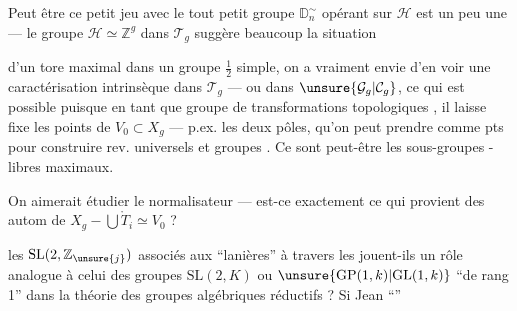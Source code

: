Peut être ce petit jeu avec le tout petit groupe $\mathbb D_n^{\sim}$ opérant sur $\mathcal H$ est un peu une  --- le groupe $\mathcal H\simeq\mathbb Z^g$ dans $\mathcal T_g$ suggère beaucoup la situation



d'un tore maximal dans un groupe $\frac12$ simple, on a vraiment envie d'en voir une caractérisation intrinsèque dans $\mathcal T_g$ --- ou dans $\unsure{\mathcal G_g|\mathcal C_g}$, ce qui est possible puisque  en tant que groupe de transformations topologiques , il laisse fixe les points de $V_0\subset X_g$ --- p.ex. les deux pôles, qu'on peut prendre comme pts  pour construire rev. universels et groupes . Ce sont peut-être les sous-groupes -libres maximaux.

On aimerait étudier le normalisateur --- est-ce exactement ce qui provient des autom de $X_g-\bigcup\mathring{T}_i\simeq V_0$ ?

les $\mathrm{SL}(2,\mathbb Z_{\unsure{j}})$ associés aux ``lanières'' à travers les   jouent-ils un rôle analogue à celui des groupes $\mathrm{SL}(2,K)$ ou $\unsure{\mathrm{GP}(1,k)|\mathrm{GL}(1,k)}$ ``de rang 1'' dans la théorie des groupes algébriques réductifs ? Si Jean  ``''

